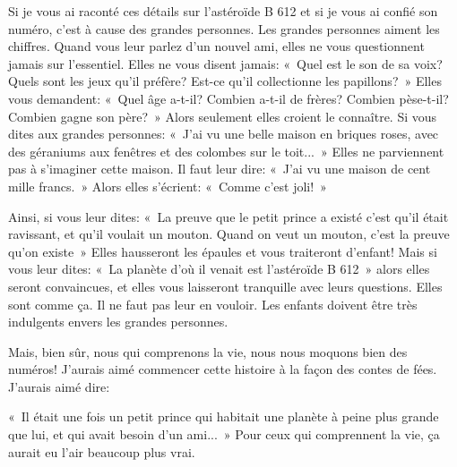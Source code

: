 \documentclass{report}
\begin{document}
Si je vous ai raconté ces détails sur l'astéroïde B 612 et si je vous ai confié son numéro, c'est à cause des grandes personnes. Les grandes personnes aiment les chiffres. Quand vous leur parlez d'un nouvel ami, elles ne vous questionnent jamais sur l'essentiel. Elles ne vous disent jamais: «~Quel est le son de sa voix? Quels sont les jeux qu'il préfère? Est-ce qu'il collectionne les papillons?~» Elles vous demandent: «~Quel âge a-t-il? Combien a-t-il de frères? Combien pèse-t-il? Combien gagne son père?~» Alors seulement elles croient le connaître. Si vous dites aux grandes personnes: «~J'ai vu une belle maison en briques roses, avec des géraniums aux fenêtres et des colombes sur le toit...~» Elles ne parviennent pas à s'imaginer cette maison. Il faut leur dire: «~J'ai vu une maison de cent mille francs.~» Alors elles s'écrient: «~Comme c'est joli!~»

Ainsi, si vous leur dites: «~La preuve que le petit prince a existé c'est qu'il était ravissant, et qu'il voulait un mouton. Quand on veut un mouton, c'est la preuve qu'on existe~» Elles hausseront les épaules et vous traiteront d'enfant! Mais si vous leur dites: «~La planète d'où il venait est l'astéroïde B 612~» alors elles seront convaincues, et elles vous laisseront tranquille avec leurs questions. Elles sont comme ça. Il ne faut pas leur en vouloir. Les enfants doivent être très indulgents envers les grandes personnes.

Mais, bien sûr, nous qui comprenons la vie, nous nous moquons bien des numéros! J'aurais aimé commencer cette histoire à la façon des contes de fées. J'aurais aimé dire:

«~Il était une fois un petit prince qui habitait une planète à peine plus grande que lui, et qui avait besoin d'un ami...~» Pour ceux qui comprennent la vie, ça aurait eu l'air beaucoup plus vrai.
\end{document}
